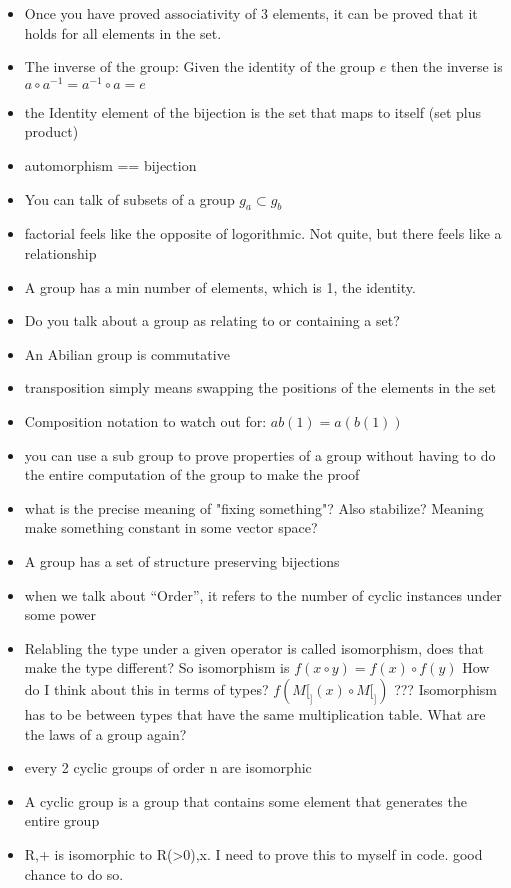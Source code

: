 \documentclass{article}
\begin{document}
\begin{itemize}
  \item Once you have proved associativity of 3 elements, it can be proved that it holds for all elements in the set. 
  \item The inverse of the group: Given the identity of the group $ e $ then the inverse is $a \circ a^{-1} = a^{-1} \circ a = e$
  \item the Identity element of the bijection is the set that maps to itself (set plus product)
  \item automorphism == bijection
  \item You can talk of subsets of a group $g_{a} \subset g_{b}$
  \item factorial feels like the opposite of logorithmic. Not quite, but there feels like a relationship
  \item A group has a min number of elements, which is 1, the identity.
  \item Do you talk about a group as relating to or containing a set? 
  \item An Abilian group is commutative
  \item transposition simply means swapping the positions of the elements in the set
  \item Composition notation to watch out for: $ab(1) = a(b(1))$
  \item you can use a sub group to prove properties of a group without having to do the entire computation of the group to make the proof
  \item what is the precise meaning of "fixing something"?  Also stabilize? Meaning make something constant in some vector space?
  \item A group has a set of structure preserving bijections
  \item when we talk about ``Order'', it refers to the number of cyclic instances under some power
  \item Relabling the type under a given operator is called isomorphism, does that make the type different? So isomorphism is $f(x \circ y) = f(x) \circ f(y)$ How do I think about this in terms of types? $f(M[_](x) \circ M[_])$ ??? Isomorphism has to be between types that have the same multiplication table. What are the laws of a group again? 
  \item every 2 cyclic groups of order n are isomorphic
  \item A cyclic group is a group that contains some element that generates the entire group
  \item {R,+} is isomorphic to {R(>0),x}. I need to prove this to myself in code. good chance to do so.

\end{itemize}
\end{document}
